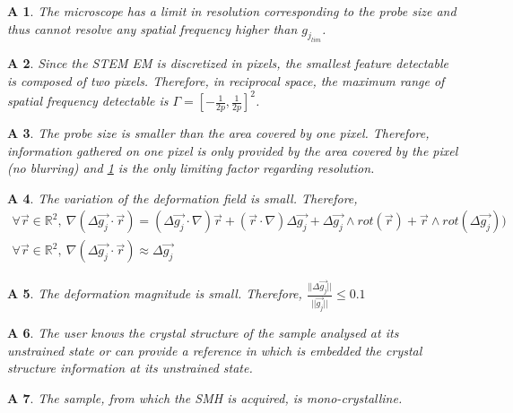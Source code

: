 \documentclass[12pt]{article}
\newtheorem{A}{A}
\begin{document}
\begin{A}
\normalfont The microscope has a limit in resolution corresponding to the probe size and thus cannot resolve any spatial frequency higher than $g_{j_{lim}}$. 
\label{A_1}
\end{A}
\begin{A}
\normalfont Since the STEM EM is discretized in pixels, the smallest feature detectable is composed of two pixels. Therefore, in reciprocal space, the maximum range of spatial frequency detectable is $\Gamma=[-\frac{1}{2p},\frac{1}{2p}]^{2}$.
\label{A_2}
\end{A}
\begin{A}
\normalfont The probe size is smaller than the area covered by one pixel. Therefore, information gathered on one pixel is only provided by the area covered by the pixel (no blurring) and \cref{A_1} is the only limiting factor regarding resolution.
\label{A_3}
\end{A}
\begin{A}
\label{A_4}
\normalfont The variation of the deformation field is small. Therefore,
\begin{equation*}
\begin{gathered}
\forall \vec{r} \in \mathbb{R}^2, \ \nabla (\Delta\overrightarrow{g_j}\cdot\vec{r})= (\Delta\overrightarrow{g_j}\cdot\nabla)\vec{r}+(\vec{r}\cdot\nabla)\Delta\overrightarrow{g_j}+\Delta\overrightarrow{g_j}\wedge rot(\vec{r})+\vec{r}\wedge rot(\Delta\overrightarrow{g_j}))\\
\forall \vec{r} \in \mathbb{R}^2, \ \nabla (\Delta\overrightarrow{g_j}\cdot\vec{r})\approx \Delta\overrightarrow{g_j}
\end{gathered}
\end{equation*}
\end{A}
\begin{A}
\label{A_5}
\normalfont The deformation magnitude is small. Therefore, $\frac{||\Delta\overrightarrow{g_j} ||}{||\overrightarrow{g_j} ||}\leq 0.1$
\end{A}
\begin{A}
\label{A_6}
\normalfont The user knows the crystal structure of the sample analysed at its unstrained state or can provide a reference in which is embedded the crystal structure information at its unstrained state.
\end{A}
\begin{A}
\label{A_7}
\normalfont The sample, from which the SMH is acquired, is mono-crystalline.
\end{A}
\end{document}
